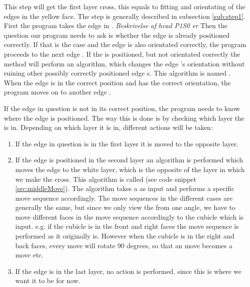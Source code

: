 This step will get the first layer cross, this equals to fitting and orientating of the edges in the yellow face. 
The step is generally described in subsection \ref{sub:step1}.
First the program takes the edge \cubie{} in \cubicle{} . \emph{Beskrivelse af hvad P1S0 er}
Then the question our program needs to ask is whether the edge \cpiece{} is already positioned correctly.
If that is the case and the edge \cpiece{} is also orientated correctly, the program proceeds to the next edge \cpiece{}.
If the \cubicle{} is positioned, but not orientated correctly the method will perform an algorithm, which changes the edge \cpiece{}'s orientation without ruining other possibly correctly positioned edge \cpiece{}s. 
This algorithm is named . When the edge \cpiece{} is in the correct position and has the correct orientation, the program moves on to another edge \cpiece{}. 

If the edge \cpiece{} in question is not in its correct position, the program needs to know where the edge is positioned.
The way this is done is by checking which layer the \cubie{} is in.
Depending on which layer it is in, different actions will be taken:
\begin{enumerate}
	\item If the edge \cpiece{} in question is in the first layer it is moved to the opposite layer.
	\item If the edge \cpiece{} is positioned in the second layer an algorithm is performed which moves the edge \cpiece{} to the white layer, which is the opposite of the layer in which we make the cross. This algorithm is called  (see code snippet \ref{src:middleMove}). The algorithm takes a \cubicle{} as input and performs a specific move sequence accordingly. The move sequences in the different cases are generally the same, but since we only view the \rubik{} from one angle, we have to move different faces in the move sequence accordingly to the cubicle which is input. e.g. if the cubicle is in the front and right faces the move sequence is performed as it originally is. However when the cubicle is in the right and back faces, every move will rotate 90 degrees, so that an  move becomes a  move etc.
	\item If the edge \cubie{} is in the last layer, no action is performed, since this is where we want it to be for now.
\end{enumerate}

